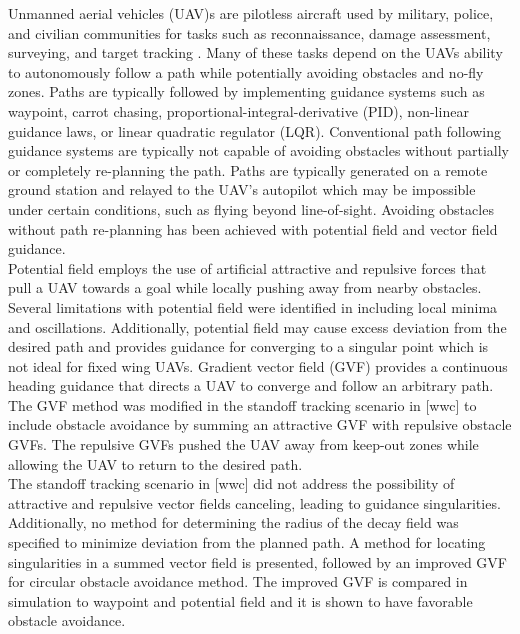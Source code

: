 \documentclass[conf]{new-aiaa}
\begin{document}
Unmanned aerial vehicles (UAV)s are pilotless aircraft used by military, police, and civilian communities for tasks such as reconnaissance, damage assessment, surveying, and target tracking \cite{ariyur_autonomous_2008,teuliere_chasing_2011}. Many of these tasks depend on the UAVs ability to autonomously follow a path while potentially avoiding obstacles and no-fly zones. Paths are typically followed by implementing guidance systems such as waypoint, carrot chasing, proportional-integral-derivative (PID), non-linear guidance laws, or linear quadratic regulator (LQR). Conventional path following guidance systems are typically not capable of avoiding obstacles without partially or completely re-planning the path. Paths are typically generated on a remote ground station and relayed to the UAV’s autopilot which may be impossible under certain conditions, such as flying beyond line-of-sight. Avoiding obstacles without path re-planning has been achieved with potential field \cite{borenstein_real-time_1990,borenstein_vector_1991} and vector field \cite{frew_cooperative_2007,griffiths_vector_2006,goncalves_artificial_2009,goncalves_circulation_2010,goncalves_vector_2010} guidance.\\

 Potential field employs the use of artificial attractive and repulsive forces that pull a UAV towards a goal while locally pushing away from nearby obstacles.  Several limitations with potential field were identified in \cite{koren_potential_1991} including local minima and oscillations. Additionally, potential field may cause excess deviation from the desired path and provides guidance for converging to a singular point which is not ideal for fixed wing UAVs.
Gradient vector field (GVF) provides a continuous heading guidance that directs a UAV to converge and follow an arbitrary path. The GVF method was modified in the standoff tracking scenario in [wwc] to include obstacle avoidance by summing an attractive GVF with repulsive obstacle GVFs. The repulsive GVFs pushed the UAV away from keep-out zones while allowing the UAV to return to the desired path. \\

The standoff tracking scenario in [wwc] did not address the possibility of attractive and repulsive vector fields canceling, leading to guidance singularities. Additionally, no method for determining the radius of the decay field was specified to minimize deviation from the planned path. A method for locating singularities in a summed vector field is presented, followed by an improved GVF for circular obstacle avoidance method. The improved GVF is compared in simulation to waypoint and potential field and it is shown to have favorable obstacle avoidance.
\end{document}
